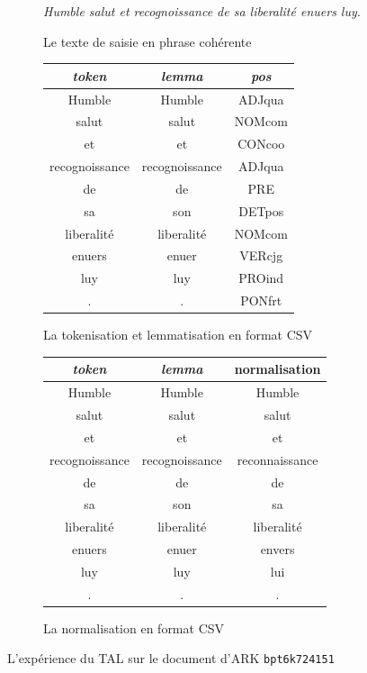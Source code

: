 \documentclass[class=article, crop=false]{standalone}
\begin{document}
\begin{figure}
\centering
\begin{subfigure}[b]{\textwidth}
\centering
\textit{Humble salut et recognoissance de sa liberalité enuers luy.}
\caption{Le texte de saisie en phrase cohérente}
\end{subfigure}

\vspace{1mm}

\begin{subfigure}[b]{\textwidth}\centering
\begin{tabular}{|c|c|c|}
\hline
\textit{token} & \textit{lemma} & \textit{pos}\\
\hline\hline
Humble & Humble & ADJqua\\ \hline
salut & salut & NOMcom\\ \hline
et & et & CONcoo\\ \hline
recognoissance & recognoissance & ADJqua\\ \hline
de & de & PRE\\ \hline
sa & son & DETpos \\ \hline
liberalité & liberalité & NOMcom\\ \hline
enuers & enuer & VERcjg\\ \hline
luy & luy & PROind\\ \hline
. & .& PONfrt\\ \hline
\end{tabular}
\caption{La tokenisation et lemmatisation en format \acrshort{CSV}}
\end{subfigure}

\vspace{1mm}

\begin{subfigure}[b]{\textwidth}\centering
\begin{tabular}{|c|c|c|}
\hline
\textit{token} & \textit{lemma} & normalisation\\
\hline\hline
Humble & Humble & Humble\\ \hline
salut & salut & salut\\ \hline
et & et & et\\ \hline
recognoissance & recognoissance & reconnaissance\\ \hline
de & de & de\\ \hline
sa & son & sa \\ \hline
liberalité & liberalité & liberalité\\ \hline
enuers & enuer & envers\\ \hline
luy & luy & lui\\ \hline
. & .& .\\ \hline
\end{tabular}
\caption{La normalisation en format \acrshort{CSV}}
\end{subfigure}

\vspace{1mm}


\caption{L'expérience du \acrlong{TAL} sur le document d'\acrshort{ARK} \texttt{bpt6k724151}}
\label{fig:tal}
\end{figure}
\end{document}

